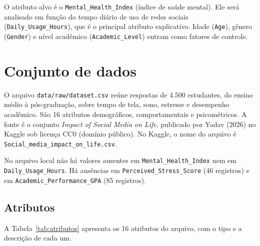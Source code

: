 \documentclass[
  article,
  12pt,
  oneside,
  a4paper,
  english,
  brazil,
  chapter=TITLE,
  section=TITLE,
  subsection=TITLE
]{abntex2}
\begin{document}
O atributo alvo é o \texttt{Mental\_Health\_Index} (índice de saúde mental). Ele será analisado em função do tempo diário de uso de redes sociais (\texttt{Daily\_Usage\_Hours}), que é o principal atributo explicativo. Idade (\texttt{Age}), gênero (\texttt{Gender}) e nível acadêmico (\texttt{Academic\_Level}) entram como fatores de controle.

\section{Conjunto de dados}

O arquivo \texttt{data/raw/}\allowbreak\texttt{dataset.csv} reúne respostas de 4.500 estudantes, do ensino médio à pós-graduação, sobre tempo de tela, sono, estresse e desempenho acadêmico. São 16 atributos demográficos, comportamentais e psicométricos. A fonte é o conjunto \textit{Impact of Social Media on Life}, publicado por Yadav (2026) no Kaggle sob licença CC0 (domínio público). No Kaggle, o nome do arquivo é \texttt{Social\_media\_impact\_on\_life.csv}.

No arquivo local não há valores ausentes em \texttt{Mental\_Health\_Index} nem em \texttt{Daily\_Usage\_Hours}. Há ausências em \texttt{Perceived\_Stress\_Score} (46 registros) e em \texttt{Academic\_Performance\_GPA} (85 registros).

\subsection{Atributos}

A Tabela~\ref{tab:atributos} apresenta os 16 atributos do arquivo, com o tipo e a descrição de cada um.
\end{document}
